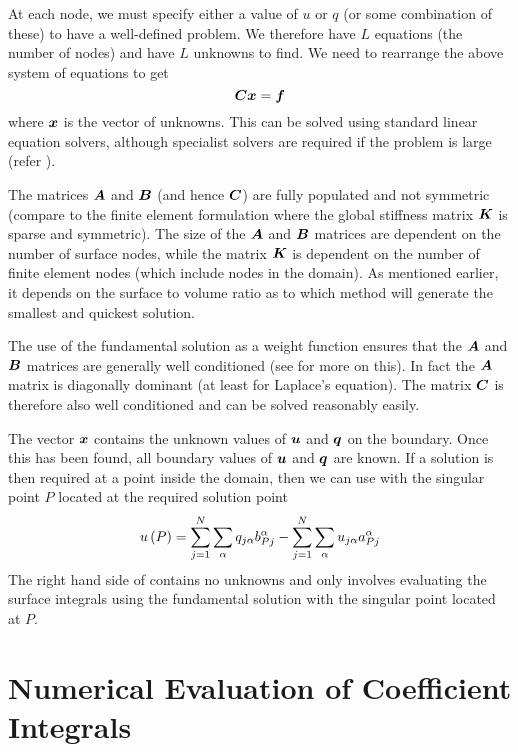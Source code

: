 At each node, we must specify either
a value of $u$ or $q$ (or some combination of these) to have a well-defined
problem.  We therefore have $L$ equations (the number of nodes) and have $L$
unknowns to find.  We need to rearrange the above system of equations to get
\begin{equation}
  \matr{C}\vect{x} = \vect{f}
  \label{eqn:ms2}
\end{equation}
where $\vect{x}$ is the vector of unknowns.  This can be solved using standard
linear equation solvers, although specialist solvers are required if the
problem is large (refer ).

The matrices $\matr{A}$ and $\matr{B}$ (and hence $\matr{C}$) are fully populated
and not symmetric (compare to the finite element formulation where the global
stiffness matrix $\matr{K}$ is sparse and symmetric).  The size of the $\matr{A}$
and $\matr{B}$ matrices are dependent on the number of surface nodes, while the
matrix $\matr{K}$ is dependent on the number of finite element nodes (which
include nodes in the domain). As mentioned earlier, it depends on the surface
to volume ratio as to which method will generate the smallest and quickest
solution.

The use of the fundamental solution as a weight function ensures that the
$\matr{A}$ and $\matr{B}$ matrices are generally well conditioned (see
 for more on this).  In fact the $\matr{A}$ matrix is
diagonally dominant (at least for Laplace's equation). The matrix $\matr{C}$ is
therefore also well conditioned and  can be solved reasonably
easily.

The vector $\vect{x}$ contains the unknown values of $\vect{u}$ and $\vect{q}$ on
the boundary.  Once this has been found, all boundary values of $\vect{u}$ and
$\vect{q}$ are known.  If a solution is then required at a point inside the
domain, then we can use  with the singular point $P$ located
at the required solution point \ie
\begin{equation}
   u\left( P \right)  =  \displaystyle\sum_{j=1}^{N}   \displaystyle\sum_{\alpha}^{}  q_{j\alpha}b_{Pj}^{\alpha}  - 
   \displaystyle\sum_{j=1}^{N}   \displaystyle\sum_{\alpha}^{}  u_{j\alpha}a_{Pj}^{\alpha}
  \label{eqn:rsp}
\end{equation}
The right hand side of  contains no unknowns and only involves
evaluating the surface integrals using the fundamental solution with the
singular point located at $P$.

\section{Numerical Evaluation of Coefficient Integrals}
\label{sec:Numevalcoeff}


